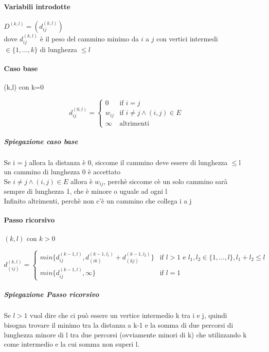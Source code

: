 \documentclass[12pt, a4paper, openany]{book}
\begin{document}
\paragraph{Variabili introdotte} $D^{(k,l)}= (d^{(k,l)}_{ij})$ \\
dove $d^{(k,l)}_{ij}$ è il peso del cammino minimo da $i$ a $j$
con vertici intermedi $\in \{1,...,k\}$ di lunghezza $\leq l$

\paragraph{Caso base} (k,l) con k=0

\begin{equation*}
    d^{(0,l)}_{ij}= \begin{cases}
        0      & \text{if $i = j$}                      \\
        w_{ij} & \text{if $i \neq j \land (i,j) \in E$} \\
        \infty & \text{altrimenti}
    \end{cases}
\end{equation*}

\subparagraph{Spiegazione caso base}
Se i = j allora la distanza è 0, siccome il cammino deve essere di lunghezza $\leq$l un cammino di lunghezza 0 è accettato
\\Se $i \neq j \land (i,j) \in E$ allora è $w_{ij}$, perchè siccome cè un solo cammino sarà sempre di lunghezza 1, che è minore o uguale ad ogni l
\\Infinito altrimenti, perchè non c'è un cammino che collega i a j

\paragraph{Passo ricorsivo} $(k,l)$ con $k>0$

\begin{equation*}
    d^{(k,l)}_{(ij)} = \begin{cases}
        min\{d^{(k-1,l)}_{ij}, d^{(k-1,l_1)}_{(ik)} + d^{(k-1,l_2)}_{(kj)}  \} & \text{if $l > 1$ e $l_1,l_2\in\{1,...,l\}, l_1+l_2\leq l$ } \\
        min\{d^{(k-1,l)}_{ij}, \infty \}                                       & \text{if $l = 1$}
    \end{cases}
\end{equation*}

\subparagraph*{Spiegazione Passo ricorsivo}
Se $l > 1$ vuol dire che ci può essere un vertice intermedio k tra i e j, quindi bisogna trovare il minimo tra
la distanza a k-1 e la somma di due percorsi di lunghezza minore di l tra due percorsi (ovviamente minori di k) che utilizzando k come intermedio e la
cui somma non superi l.
\end{document}
